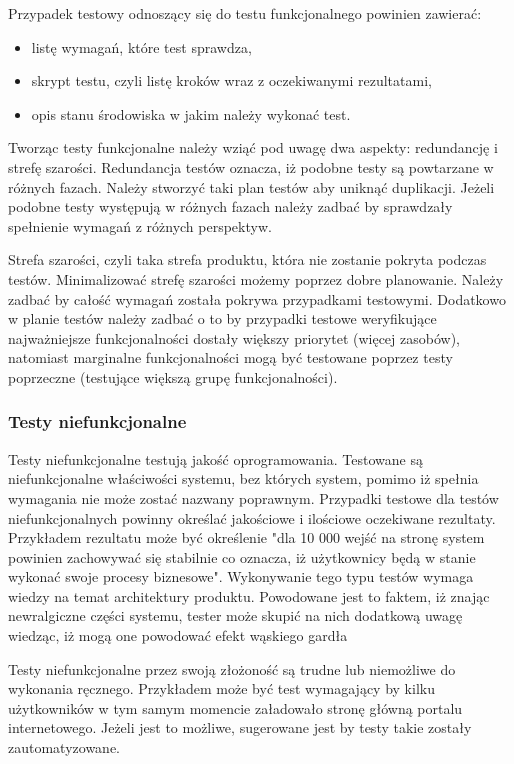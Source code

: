 Przypadek testowy odnoszący się do testu funkcjonalnego powinien zawierać:
\begin{itemize}
  \item  listę wymagań, które test sprawdza,
  \item skrypt testu, czyli listę kroków wraz z oczekiwanymi rezultatami,
  \item opis stanu środowiska w jakim należy wykonać test.
\end{itemize}

Tworząc testy funkcjonalne należy wziąć pod uwagę dwa aspekty: redundancję i strefę szarości. Redundancja testów oznacza, iż podobne testy są powtarzane w różnych fazach. Należy stworzyć taki plan testów aby uniknąć duplikacji. Jeżeli podobne testy występują w różnych fazach należy zadbać by sprawdzały spełnienie wymagań z różnych perspektyw. 

Strefa szarości, czyli taka strefa produktu, która nie zostanie pokryta podczas testów. Minimalizować strefę szarości możemy poprzez dobre planowanie. Należy zadbać by całość wymagań została pokrywa przypadkami testowymi. Dodatkowo w planie testów należy zadbać o to by przypadki testowe weryfikujące najważniejsze funkcjonalności dostały większy priorytet (więcej zasobów), natomiast marginalne funkcjonalności mogą być testowane poprzez testy poprzeczne (testujące większą grupę funkcjonalności).
\subsubsection{Testy niefunkcjonalne}
Testy niefunkcjonalne testują jakość oprogramowania. Testowane są  niefunkcjonalne właściwości systemu, bez których system, pomimo iż spełnia wymagania nie może zostać nazwany poprawnym. Przypadki testowe dla testów niefunkcjonalnych powinny określać jakościowe i ilościowe oczekiwane rezultaty. Przykładem rezultatu może być określenie "dla 10 000 wejść na stronę system powinien zachowywać się stabilnie co oznacza, iż użytkownicy będą w stanie wykonać swoje procesy biznesowe". Wykonywanie tego typu testów wymaga wiedzy na temat architektury produktu. Powodowane jest to faktem, iż znając newralgiczne części systemu, tester może skupić na nich dodatkową uwagę wiedząc, iż mogą one powodować efekt wąskiego gardła


Testy niefunkcjonalne przez swoją złożoność są trudne lub niemożliwe do wykonania ręcznego. Przykładem może być test wymagający by kilku użytkowników w tym samym momencie załadowało stronę główną portalu internetowego. Jeżeli jest to możliwe, sugerowane jest by testy takie zostały zautomatyzowane.
